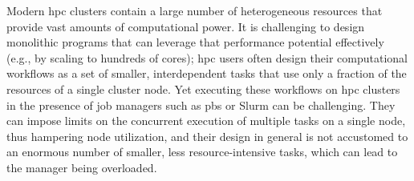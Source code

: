 Modern \gls{hpc} clusters contain a large number of heterogeneous resources that
provide vast amounts of computational power. It is challenging to design monolithic programs that
can leverage that performance potential effectively (e.g., by scaling to hundreds of cores);
\gls{hpc} users often design their computational workflows as a set of smaller,
interdependent tasks that use only a fraction of the resources of a single cluster node. Yet
executing these workflows on \gls{hpc} clusters in the presence of job managers such
as \gls{pbs} or Slurm can be challenging. They can impose limits on the concurrent
execution of multiple tasks on a single node, thus hampering node utilization, and their design in
general is not accustomed to an enormous number of smaller, less resource-intensive tasks, which
can lead to the manager being overloaded.
